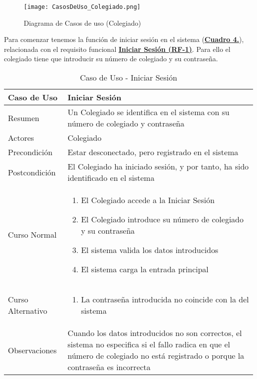 \begin{figure}[!htbp]
  \centering
  \texttt{[image: CasosDeUso\_Colegiado.png]}
  \caption{Diagrama de Casos de uso (Colegiado)}
  \label{fig:CasosDeUso_Colegiado}
\end{figure}
\FloatBarrier

\addtocounter{tabla}{1}
Para comenzar tenemos la función de iniciar sesión en el sistema (\textbf{\hyperref[tab:cucIniSes]{Cuadro 4.}}), relacionada con el requisito funcional \textbf{\hyperref[tab:rfIniSes]{Iniciar Sesión (RF-1)}}. Para ello el colegiado tiene que introducir su número de colegiado y su contraseña.

\begin{table}[!htbp]
  \centering  \addtocounter{casouso}{1}
  \begin{tabular}{|l | p{100mm}|}
    \textbf{Caso de Uso}  & \textbf{Iniciar Sesión} \\ \hline
    Resumen 		 & Un Colegiado se identifica en el sistema con su número de colegiado y contraseña \\ \hline
    Actores  		 & Colegiado \\ \hline
    Precondición  	 & Estar desconectado, pero registrado en el sistema \\ \hline
    Postcondición  	 & El Colegiado ha iniciado sesión, y por tanto, ha sido identificado en el sistema \\ \hline
    Curso Normal   	 & \begin{enumerate}
	  \item El Colegiado accede a la Iniciar Sesión
	  \item El Colegiado introduce su número de colegiado y su contraseña
	  \item El sistema valida los datos introducidos
	  \item El sistema carga la entrada principal
    \end{enumerate}  \\ \hline
    Curso Alternativo  & \begin{enumerate}
	  \item La contraseña introducida no coincide con la del sistema
    \end{enumerate}  \\ \hline
    Observaciones 	 & Cuando los datos introducidos no son correctos, el sistema no especifica si el fallo radica en que el número de colegiado no está registrado o porque la contraseña es incorrecta  \\ \hline
  \end{tabular}
  \caption{Caso de Uso  - Iniciar Sesión}
  \label{tab:cucIniSes}
\end{table}
\FloatBarrier

